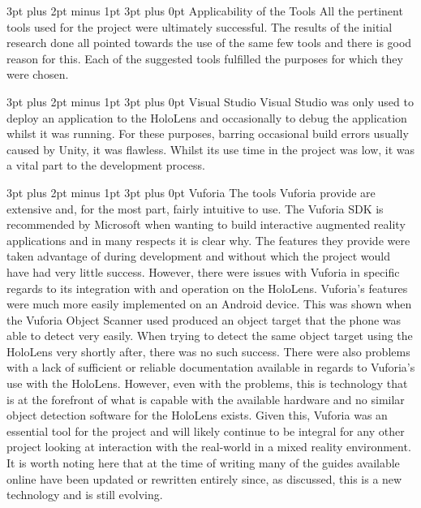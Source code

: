 \documentclass[12pt,a4paper,oneside]{article}
\makeatletter
\renewcommand\subsubsection{\@startsection {subsubsection}{1}{0mm} %
	                           {3pt plus 2pt minus 1pt} %
	                           {3pt plus 0pt} %
	                           {\normalfont\bfseries}}
\renewcommand\subsection{\@startsection {subsection}{1}{0mm} %
                               {3pt plus 2pt minus 1pt} %
                               {3pt plus 0pt} %
                               {\large\bfseries}}
\makeatother
\begin{document}
\subsection{Applicability of the Tools}
All the pertinent tools used for the project were ultimately successful. The results of the initial research done all pointed towards the use of the same few tools and there is good reason for this. Each of the suggested tools fulfilled the purposes for which they were chosen. 

\subsubsection{Visual Studio}
Visual Studio was only used to deploy an application to the HoloLens and occasionally to debug the application whilst it was running. For these purposes, barring occasional build errors usually caused by Unity, it was flawless. Whilst its use time in the project was low, it was a vital part to the development process.

\subsubsection{Vuforia}
The tools Vuforia provide are extensive and, for the most part, fairly intuitive to use. The Vuforia SDK is recommended by Microsoft when wanting to build interactive augmented reality applications and in many respects it is clear why. The features they provide were taken advantage of during development and without which the project would have had very little success. However, there were issues with Vuforia in specific regards to its integration with and operation on the HoloLens. Vuforia's features were much more easily implemented on an Android device. This was shown when the Vuforia Object Scanner used produced an object target that the phone was able to detect very easily. When trying to detect the same object target using the HoloLens very shortly after, there was no such success. There were also problems with a lack of sufficient or reliable documentation available in regards to Vuforia's use with the HoloLens. However, even with the problems, this is technology that is at the forefront of what is capable with the available hardware and no similar object detection software for the HoloLens exists. Given this, Vuforia was an essential tool for the project and will likely continue to be integral for any other project looking at interaction with the real-world in a mixed reality environment. It is worth noting here that at the time of writing many of the guides available online have been updated or rewritten entirely since, as discussed, this is a new technology and is still evolving.
\end{document}
